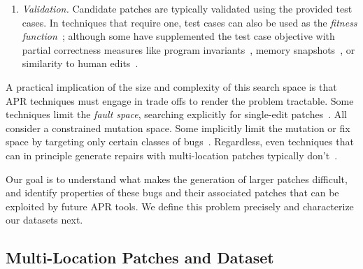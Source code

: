 \documentclass[10pt, conference]{IEEEtran}
\begin{document}
\begin{enumerate}[wide]
\item \emph {Validation.}
Candidate patches are typically
validated using the provided test cases. In techniques
that require one, test cases can also be used as the \emph{fitness
  function}~\cite{genprog}; although some have supplemented the test case
objective with partial correctness measures like program
invariants~\cite{dinglyu}, memory snapshots~\cite{source-code-checkpoint}, or
similarity to human edits~\cite{hdrepair}.

\end{enumerate}

A practical implication of the size and complexity of this search space is
that APR techniques must engage in trade offs to render the problem tractable. 
Some techniques limit the \emph{fault space},
searching explicitly for single-edit patches~\cite{rsrepair,ae,hdrepair,capgen}.
All consider a constrained mutation space. 
Some implicitly limit the mutation or fix space by targeting only certain
classes of bugs~\cite{Xuan17,sapfix,DeMarco14,par}. Regardless, even techniques
that can in principle generate repairs with multi-location patches typically
don't~\cite{patch-correctness}.
%

Our goal is to understand what makes the generation of larger
patches difficult, and identify properties of these bugs and their associated
patches that can be exploited by future APR tools.  
We define this problem precisely and characterize our datasets next.

\subsection{Multi-Location Patches and Dataset}
\label{sec:bugs}
\end{document}
